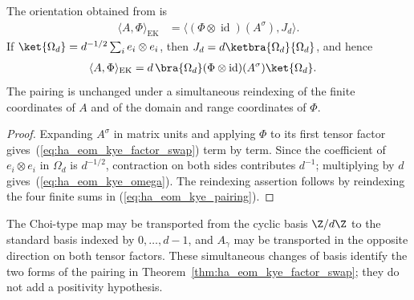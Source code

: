\begin{theorem}
    \label{thm:ha_eom_kye_factor_swap}
    \leanok
    The orientation obtained from
    \cite[equations (12)--(13), p.~137; Theorem~3.3 and the concluding
        shuffled pairing, pp.~138--139]{EomKye2000Duality} is
    \begin{align}
        \langle A,\Phi\rangle_{\mathrm{EK}}
         & =\bigl\langle(\Phi\otimes\operatorname{id})(A^\sigma),J_d\bigr\rangle.
        \label{eq:ha_eom_kye_factor_swap}
    \end{align}
    If $\ket{\Omega_d}=d^{-1/2}\sum_i e_i\otimes e_i$, then
    $J_d=d\ketbra{\Omega_d}{\Omega_d}$, and hence
    \begin{align}
        \langle A,\Phi\rangle_{\mathrm{EK}}
         & =d\,\bra{\Omega_d}
             (\Phi\otimes\operatorname{id})(A^\sigma)
             \ket{\Omega_d}.
        \label{eq:ha_eom_kye_omega}
    \end{align}
    The pairing is unchanged under a simultaneous reindexing of the finite
    coordinates of $A$ and of the domain and range coordinates of $\Phi$.
\end{theorem}

\begin{proof}
    \leanok
    Expanding $A^\sigma$ in matrix units and applying $\Phi$ to its first
    tensor factor gives~(\ref{eq:ha_eom_kye_factor_swap}) term by term.
    Since the coefficient of $e_i\otimes e_i$ in $\Omega_d$ is
    $d^{-1/2}$, contraction on both sides contributes $d^{-1}$; multiplying
    by $d$ gives~(\ref{eq:ha_eom_kye_omega}). The reindexing assertion
    follows by reindexing the four finite sums in
    (\ref{eq:ha_eom_kye_pairing}).
\end{proof}

\begin{definition}
    \label{def:ha_pairing_coordinates}
    \leanok
    The Choi-type map may be transported from the cyclic basis
    $\Z/d\Z$ to the standard basis indexed by $0,\ldots,d-1$, and
    $A_\gamma$ may be transported in the opposite direction on both tensor
    factors. These simultaneous changes of basis identify the two forms of
    the pairing in Theorem~\ref{thm:ha_eom_kye_factor_swap}; they do not add
    a positivity hypothesis.
\end{definition}

